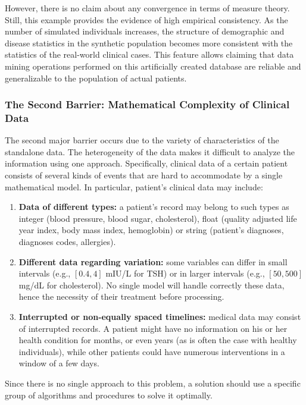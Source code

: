 However, there is no claim about any convergence in terms of measure theory. Still, this example provides the evidence of high empirical consistency. As the number of simulated individuals increases, the structure of demographic and disease statistics in the synthetic population becomes more consistent with the statistics of the real-world clinical cases. This feature allows claiming that data mining operations performed on this artificially created database are reliable and generalizable to the population of actual patients.

\subsubsection*{The Second Barrier: Mathematical Complexity of Clinical Data}

The second major barrier occurs due to the variety of characteristics of the standalone data. The heterogeneity of the data makes it difficult to analyze the information using one approach. Specifically, clinical data of a certain patient consists of several kinds of events that are hard to accommodate by a single mathematical model. In particular, patient's clinical data may include:
\vspace{0.2em}
\begin{enumerate}
    \item \textbf{Data of different types:} a patient's record may belong to such types as integer (blood pressure, blood sugar, cholesterol), float (quality adjusted life year index, body mass index, hemoglobin) or string (patient's diagnoses, diagnoses codes, allergies).

    \item \textbf{Different data regarding variation:} some variables can differ in small intervals (e.g., $[0.4, 4]$ mIU/L for TSH) or in larger intervals (e.g., $[50, 500]$ mg/dL for cholesterol). No single model will handle correctly these data, hence the necessity of their treatment before processing.

    \item \textbf{Interrupted or non-equally spaced timelines:} medical data may consist of interrupted records. A patient might have no information on his or her health condition for months, or even years (as is often the case with healthy individuals), while other patients could have numerous interventions in a window of a few days.
\end{enumerate}
\vspace{1em}
Since there is no single approach to this problem, a solution should use a specific group of algorithms and procedures to solve it optimally.
